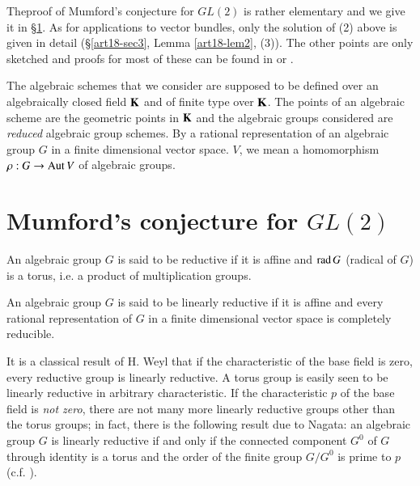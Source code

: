 The\pageoriginale proof of Mumford's conjecture for $GL(2)$ is rather elementary and we give it in \S\ref{art18-sec1}. As for applications to vector bundles, only the solution of (2) above is given in detail (\S\ref{art18-sec3}, Lemma \ref{art18-lem2}, (3)). The other points are only sketched and proofs for most of these can be found in \cite{art18-key5} or \cite{art18-key12}.

The algebraic schemes that we consider are supposed to be defined over an algebraically closed field $\mathbf{K}$ and of finite type over $\mathbf{K}$. The points of an algebraic scheme are the geometric points in $\mathbf{K}$ and the algebraic groups considered are {\em reduced} algebraic group schemes. By a rational representation of an algebraic group $G$ in a finite dimensional vector space. $V$, we mean a homomorphism $\rho:G\to \operatorname{\mathrm{Aut}} V$ of algebraic groups.

\section{Mumford's conjecture for \texorpdfstring{$GL(2)$}{GL2}}\label{art18-sec1}

\begin{definition}\label{art18-defi1}
An algebraic group $G$ is said to be reductive if it is affine and $\operatorname{\mathrm{rad}} G$ (radical of $G$) is a torus, i.e. a product of multiplication groups.
\end{definition}

\begin{definition}\label{art18-defi2}
An algebraic group $G$ is said to be linearly reductive if it is affine and every rational representation of $G$ in a finite dimensional vector space is completely reducible.
\end{definition}

It is a classical result of H. Weyl that if the characteristic of the base field is zero, every reductive group is linearly reductive. A torus group is easily seen to be linearly reductive in arbitrary characteristic. If the characteristic $p$ of the base field is {\em not zero}, there are not many more linearly reductive groups other than the torus groups; in fact, there is the following result due to Nagata: an algebraic group $G$ is linearly reductive if and only if the connected component $G^{0}$ of $G$ through identity is a torus and the order of the finite group $G/G^{0}$ is prime to $p$ (c.f. \cite{art18-key6}).

